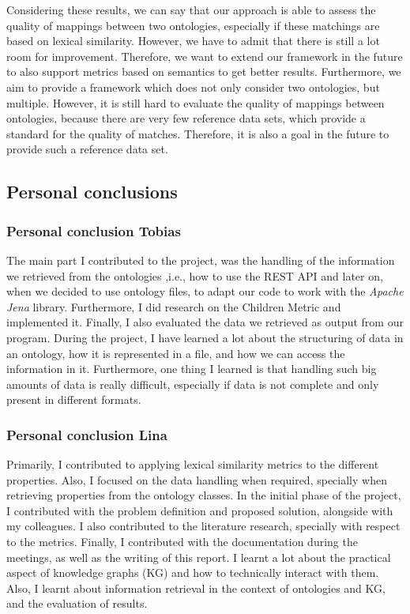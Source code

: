 \documentclass[runningheads]{llncs}
\begin{document}
Considering these results, we can say that our approach is able to assess the quality of mappings between two ontologies, especially if these matchings are based on lexical similarity. However, we have to admit that there is still a lot room for improvement. Therefore, we want to extend our framework in the future to also support metrics based on semantics to get better results. Furthermore, we aim to provide a framework which does not only consider two ontologies, but multiple. However, it is still hard to evaluate the quality of mappings between ontologies, because there are very few reference data sets, which provide a standard for the quality of matches. Therefore, it is also a goal in the future to provide such a reference data set.

\subsection{Personal conclusions} \label{personal_conclusions}
\subsubsection{Personal conclusion Tobias}
The main part I contributed to the project, was the handling of the information we retrieved from the ontologies ,i.e., how to use the REST API and later on, when we decided to use ontology files, to adapt our code to work with the \textit{Apache Jena} library. Furthermore, I did research on the Children Metric and implemented it. Finally, I also evaluated the data we retrieved as output from our program.
During the project, I have learned a lot about the structuring of data in an ontology, how it is represented in a file, and how we can access the information in it. Furthermore, one thing I learned is that handling such big amounts of data is really difficult, especially if data is not complete and only present in different formats.
\subsubsection{Personal conclusion Lina} Primarily, I contributed to applying lexical similarity metrics to the different properties.  Also, I focused on the data handling when required, specially when retrieving properties from the ontology classes. In the initial phase of the project, I contributed with the problem definition and proposed solution, alongside with my colleagues. I also contributed to the literature research, specially with respect to the metrics. Finally, I contributed with the documentation during the meetings, as well as the writing of this report. I learnt a lot about the practical aspect of knowledge graphs (KG) and how to technically interact with them. Also, I learnt about information retrieval in the context of ontologies and KG, and the evaluation of results.
\end{document}
